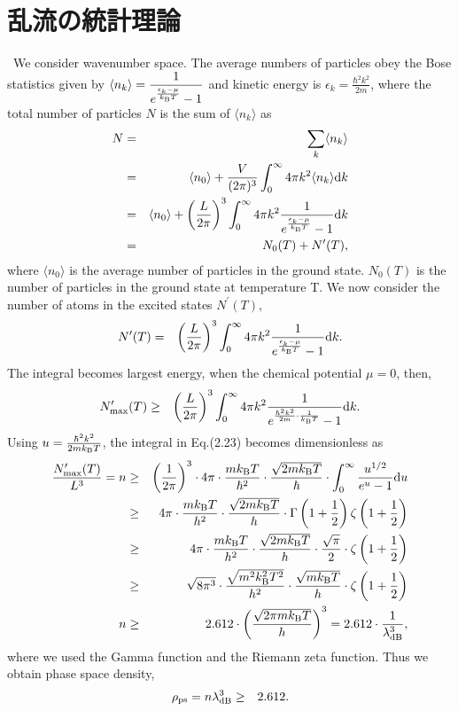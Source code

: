 \documentclass[12pt,a4paper]{jbook}
\newcommand{\diff}{\mathrm{d}}				           %
\newcommand{\kb} {k_{\rm B}}				           %
\begin{document}
\section{乱流の統計理論}
\ We consider wavenumber space.
The average numbers of particles obey the Bose statistics given by
$\displaystyle \langle n_k \rangle = \frac{1}{e^{\frac{\epsilon_k - \mu}{\kb T}} - 1}$
and kinetic energy is $\displaystyle \epsilon_k = \frac{\hbar^2 k^2}{2 m}$,
 where the total number of particles $N$ is the sum of $\langle n_k \rangle$ as
\begin{eqnarray}
N & = & \sum_k \langle n_k \rangle
\\
& = & \langle n_0 \rangle  + \frac{V}{(2\pi)^3} \int_0^\infty 4 \pi k^2 \langle n_k \rangle \diff k  \nonumber
\\
& = & \langle n_0 \rangle + \left( \frac{L}{2\pi} \right)^3 \int_0^\infty 4 \pi k^2 \nonumber
\frac{1}{e^{\frac{\epsilon_k - \mu}{\kb T}} - 1} \diff k
\\
& = & N_0(T) + N^\prime(T),
\end{eqnarray}
where $\langle n_0 \rangle$ is the average number of particles in the ground state.
$N_0(T)$ is the number of particles in the ground state at temperature T.
We now consider the number of atoms in the excited states $N^\prime(T)$,
\begin{eqnarray}
N^\prime(T) & = & \left(\frac{L}{2 \pi}\right)^3 \int_0^\infty 4 \pi k^2
 \frac{1}{e^{\frac{\epsilon_k - \mu}{\kb T}} - 1}  \diff k.
\end{eqnarray}
The integral becomes largest energy, when the chemical potential $\mu=0$, then,
\begin{eqnarray}
N^\prime_{{\rm max}}(T) & \ge & \left(\frac{L}{2 \pi}\right)^3 \int_0^\infty 4 \pi k^2
 \frac{1}{e^{\frac{\hbar^2 k^2}{2 m} \cdot \frac{1}{\kb T}} - 1}  \diff k.
\end{eqnarray}
Using $u = \frac{\hbar^2 k^2}{2 m \kb T}$, the integral in Eq.(2.23) becomes dimensionless as
\begin{eqnarray}
\frac{N^\prime_{{\rm max}}(T)}{L^3} = n  & \ge & \left(\frac{1}{2 \pi} \right)^3 \cdot
4 \pi \cdot \frac{m \kb T}{\hbar^2} \cdot \frac{\sqrt{2 m \kb T}}{\hbar} \cdot
\int_0^\infty \frac{u^{1/2}}{e^u - 1} \diff u
\\
& \ge & 4 \pi \cdot \frac{m \kb T}{h^2} \cdot \frac{\sqrt{2 m \kb T}}{h} \cdot \Gamma \left( 1+\frac{1}{2}\right) \zeta \left( 1+\frac{1}{2}\right)  \nonumber
\\
& \ge & 4 \pi \cdot \frac{m \kb T}{h^2} \cdot \frac{\sqrt{2 m \kb T}}{h} \cdot \frac{\sqrt{\pi}}{2}\cdot \zeta \left( 1+\frac{1}{2}\right) \nonumber
\\
& \ge & \sqrt{8 \pi^3} \cdot \frac{\sqrt{m^2 \kb^2 T^2}}{h^2} \cdot \frac{\sqrt{m \kb T}}{h} \cdot \zeta \left( 1+\frac{1}{2}\right) \nonumber
\\
n & \ge & 2.612 \cdot \left( \frac{\sqrt{2 \pi m \kb T}}{h} \right)^{3}
= 2.612 \cdot \frac{1}{\lambda_{{\rm dB}}^3},
\end{eqnarray}
where we used the Gamma function and the Riemann zeta function.
Thus we obtain phase space density,
\begin{eqnarray}
\rho_{{\rm ps}} = n \lambda_{{\rm dB}}^3 & \ge & 2.612.
\end{eqnarray}
\end{document}
